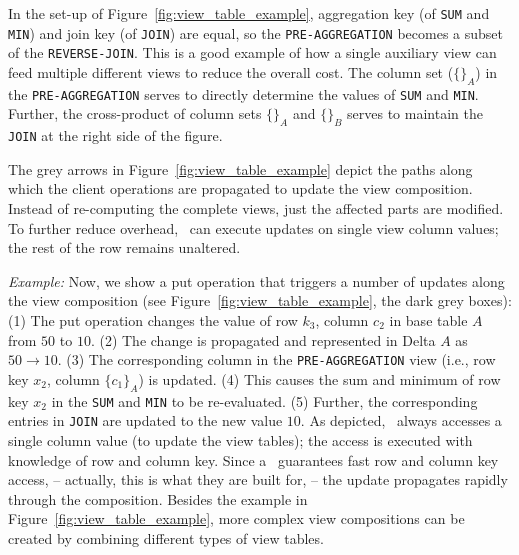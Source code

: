 %
%
In the set-up of Figure~\ref{fig:view_table_example}, aggregation key
(of \texttt{SUM} and \texttt{MIN}) and join key (of \texttt{JOIN}) are
equal, so the \texttt{PRE-AGGREGATION} becomes a subset of the
\texttt{REVERSE-JOIN}. This is a good example of how a single
auxiliary view can feed multiple different views to reduce the overall
cost. The column set ($\{\}_A$) in the \texttt{PRE-AGGREGATION} serves
to directly determine the values of \texttt{SUM} and
\texttt{MIN}. Further, the cross-product of column sets $\{\}_A$ and
$\{\}_B$ serves to maintain the \texttt{JOIN} at the right side of the
figure.

The grey arrows in Figure~\ref{fig:view_table_example} depict the
paths along which the client operations are propagated to update the
view composition.  Instead of re-computing the complete views, just
the affected parts are modified. To further reduce overhead, \VMS\ 
can execute updates on single view column values; the rest of the row 
remains unaltered. 

%
%
\textit{Example:} Now, we show a put operation that triggers a number
of updates along the view composition (see
Figure~\ref{fig:view_table_example}, the dark grey boxes): (1) The put
operation changes the value of row $k_3$, column $c_2$ in base table
$A$ from $50$ to $10$. (2) The change is propagated and represented in
Delta $A$ as $50\rightarrow 10$. (3) The corresponding column in the
\texttt{PRE-AGGREGATION} view (i.e., row key $x_2$, column
$\{c_1\}_A$) is updated. (4) This causes the sum and minimum of row
key $x_2$ in the \texttt{SUM} and \texttt{MIN} to be re-evaluated. (5)
Further, the corresponding entries in \texttt{JOIN} are updated to the
new value $10$. As depicted, \VMS\ always accesses a single column
value (to update the view tables); the access is executed with
knowledge of row and column key. Since a \KVS\ guarantees fast row and
column key access, -- actually, this is what they are built for, --
the update propagates rapidly through the composition.  Besides the
example in Figure~\ref{fig:view_table_example}, more complex view
compositions can be created by combining different types of view
tables.

%
%








 








